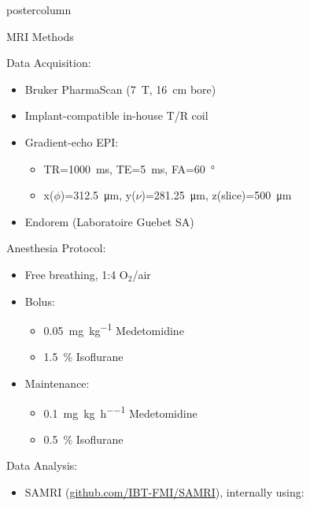 \documentclass{beamer}
\begin{document}
\begin{frame}
\begin{columns}
\begin{column}{.57\textwidth}
\begin{beamercolorbox}[center]{postercolumn}
\begin{minipage}{.98\textwidth}
{\begin{myblock}{MRI Methods}
						\begin{center}
							\begin{minipage}{.37\textwidth}
							Data Acquisition:
								\begin{itemize}
									\item Bruker PharmaScan (\SI{7}{\tesla}, \SI{16}{\centi\metre} bore)
									\item Implant-compatible in-house T/R coil
									\item Gradient-echo EPI:
										\begin{itemize}
											\item TR=\SI{1000}{\ms}, TE=\SI{5}{\ms}, FA=\SI{60}{\degree}
											\item x($\phi$)=\SI{312.5}{\um}, y($\nu$)=\SI{281.25}{\um}, z(slice)=\SI{500}{\um}
										\end{itemize}
									\item Endorem (Laboratoire Guebet SA)
								\end{itemize}
							\end{minipage}
							\begin{minipage}{.26\textwidth}
								Anesthesia Protocol:
								\begin{itemize}
									\item Free breathing, 1:4 O$_2$/air
									\item Bolus:
										\begin{itemize}
											\item \SI{0.05}{\mg\per\kg} Medetomidine
											\item \SI{1.5}{\percent} Isoflurane
										\end{itemize}
									\item Maintenance:
										\begin{itemize}
											\item \SI{0.1}{\mg\per\kg\per\hour} Medetomidine
											\item \SI{0.5}{\percent} Isoflurane
										\end{itemize}
								\end{itemize}
							\end{minipage}
							\begin{minipage}{.32\textwidth}
								Data Analysis:
								\begin{itemize}
									\item SAMRI (\href{https://github.com/IBT-FMI/SAMRI}{github.com/IBT-FMI/SAMRI}), internally using:
										\begin{multicols}{3}

\end{multicols}
\end{itemize}
\end{minipage}
\end{center}
\end{myblock}}
\end{minipage}
\end{beamercolorbox}
\end{column}
\end{columns}
\end{frame}
\end{document}
